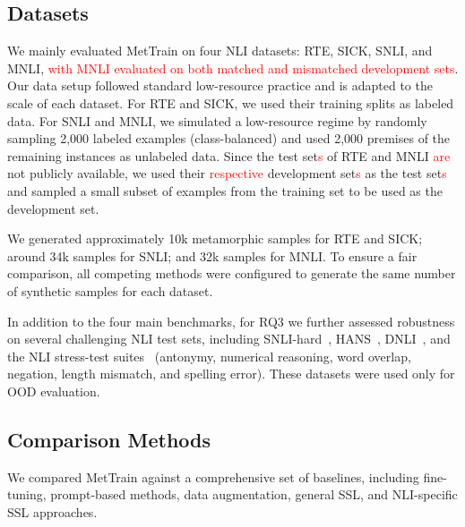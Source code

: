 \documentclass[lettersize,journal]{IEEEtran}
\newcommand{\red}[1]{\textcolor{red}{#1}}
\begin{document}
\subsection{Datasets}

We mainly evaluated MetTrain on four NLI datasets: RTE, SICK, SNLI, and MNLI, \red{with MNLI evaluated on both matched and mismatched development sets}. Our data setup followed standard low-resource practice and is adapted to the scale of each dataset. For RTE and SICK, we used their training splits as labeled data. For SNLI and MNLI, we simulated a low-resource regime by randomly sampling 2,000 labeled examples (class-balanced) and used 2,000 premises of the remaining instances as unlabeled data. Since the test set\red{s} of RTE and MNLI \red{are} not publicly available, we used their \red{respective} development set\red{s} as the test set\red{s} and sampled a small subset
of examples from the training set to be used as the development set.

We generated approximately 10k metamorphic samples for RTE and SICK; around 34k samples for SNLI; and 32k samples for MNLI. To ensure a fair comparison, all competing methods were configured to generate the same number of synthetic samples for each dataset.


In addition to the four main benchmarks, for RQ3 we further assessed robustness on several challenging NLI test sets, including SNLI-hard~\cite{gururangan-etal-2018-annotation}, HANS~\cite{mccoy-etal-2019-right}, DNLI~\cite{welleck-etal-2019-dialogue}, and the NLI stress-test suites~\cite{naik-etal-2018-stress} (antonymy, numerical reasoning, word overlap, negation, length mismatch, and spelling error). These datasets were used only for OOD evaluation.

\subsection{Comparison Methods}

We compared MetTrain against a comprehensive set of baselines, including fine-tuning, prompt-based methods, data augmentation, general SSL, and NLI-specific SSL approaches.
\end{document}
